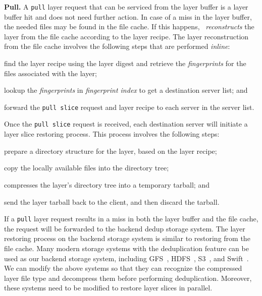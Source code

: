 {\bf Pull.}
A \texttt{pull} layer request that can be serviced from the 
layer buffer is a layer buffer hit and does not need further action. 
In case of a miss in the layer buffer, the needed files may be found in the 
file cache. If this happens, 
 \sysname~\emph{reconstructs} the layer from the file cache according to the layer recipe.
%
%
The layer reconstruction from the file cache involves the following steps that are performed \emph{inline}:

\begin{compactenumerate}
	\item find the layer recipe using the layer digest and retrieve the 
\emph{fingerprints} for the files associated with the layer;
	\item lookup the \emph{fingerprints} in \emph{fingerprint index} to get a destination server list; and
	\item forward the \texttt{pull slice} %
	request and layer recipe to each server in the server list.
\end{compactenumerate}

Once the \texttt{pull slice} 
request is received, each destination server will initiate a layer slice restoring process. This process involves  
the following steps: 

\begin{compactenumerate}
	\item prepare a directory structure for the layer, based on the layer recipe;
	\item copy the locally available files into the directory tree; 
	\item compresses the layer's directory tree into a temporary tarball; and
	\item send the layer tarball back to the client, and then discard the tarball.
\end{compactenumerate}

If a \texttt{pull} layer request results in a miss in both the layer buffer and the file cache, 
the request will be forwarded to the backend dedup storage system.
The layer restoring process on the backend storage system is similar to restoring from the file cache.
Many modern storage systems with the deduplication feature can be used as our backend storage system, including GFS~\cite{ghemawat2003google}, HDFS~\cite{hdfs}, S3~\cite{s3}, and Swift~\cite{swift}.
We can modify the above systems so that they can recognize the compressed layer file type and decompress them before performing deduplication.
Moreover, these systems need to be modified to restore layer slices in parallel. 


